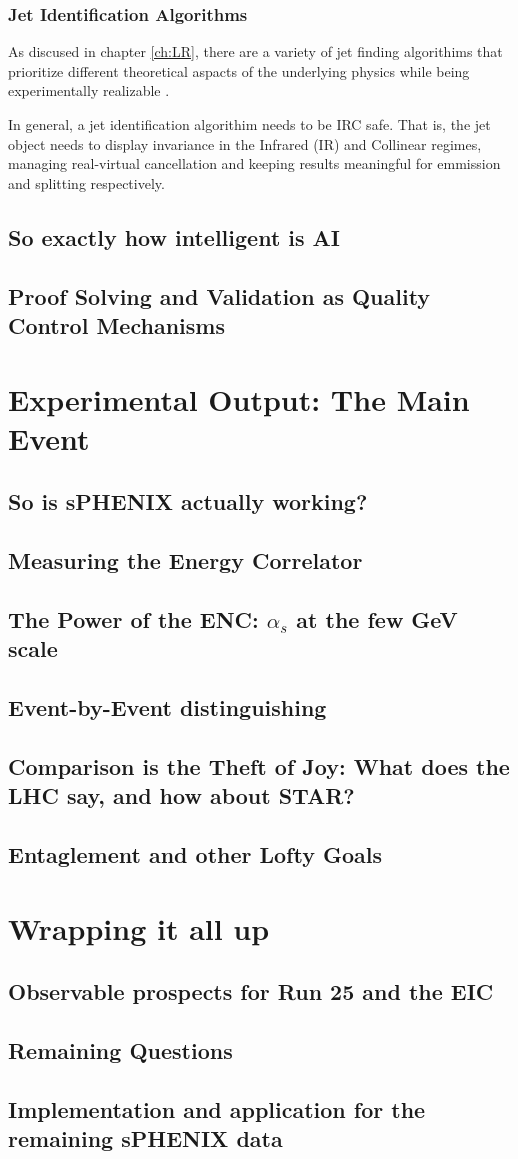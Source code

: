\documentclass[letterpaper, 12pt, oneside]{book}
\theoremstyle{definition}
\begin{document}
\section{Jet Identification Algorithms}
As discused in chapter \ref{ch:LR}, there are a variety of jet finding algorithims that prioritize different theoretical aspacts of the underlying physics while being experimentally realizable \cite{Dokshitzer1997} \cite{Atkin2015}. 

In general, a jet identification algorithim needs to be IRC safe. 
That is, the jet object needs to display invariance in the Infrared (IR) and Collinear regimes, managing real-virtual cancellation and keeping results meaningful for emmission and splitting respectively. 

\chapter{So exactly how intelligent is AI}
\chapter{Proof Solving and Validation as Quality Control Mechanisms}
\part{Experimental Output: The Main Event}
\chapter{So is sPHENIX actually working?}
\chapter{Measuring the Energy Correlator}
\chapter{The Power of the ENC: $\alpha_s$ at the few GeV scale}
\chapter{Event-by-Event distinguishing}
\chapter{Comparison is the Theft of Joy: What does the LHC say, and how about STAR?}
\chapter{Entaglement and other Lofty Goals}
\part{Wrapping it all up}
\chapter{Observable prospects for Run 25 and the EIC}
\chapter{Remaining Questions}
\chapter{Implementation and application for the remaining sPHENIX data}
\singlespacing
\printbibliography
%
%
\end{document}
